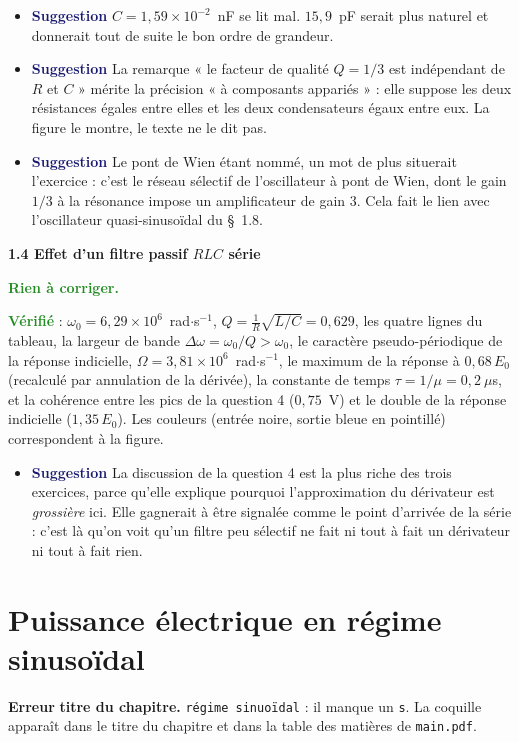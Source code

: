 \documentclass[a4paper,11pt]{article}
\newcommand{\exo}[1]{\vspace{0.7\baselineskip}\noindent\textbf{\large #1}\par\nopagebreak\vspace{0.2\baselineskip}}
\newcommand{\erreur}{\textcolor{BrickRed}{\textbf{Erreur}}}
\newcommand{\suggestion}{\textcolor{MidnightBlue}{\textbf{Suggestion}}}
\newcommand{\verifie}{\textcolor{ForestGreen}{\textbf{Vérifié}}}
\newcommand{\rien}{\textcolor{ForestGreen}{\textbf{Rien à corriger.}}}
\begin{document}
\begin{itemize}
	\item \suggestion{} $C=1{,}59\times10^{-2}$~nF se lit mal. $15{,}9$~pF serait plus naturel et
	donnerait tout de suite le bon ordre de grandeur.
	\item \suggestion{} La remarque « le facteur de qualité $Q=1/3$ est indépendant de $R$ et $C$ »
	mérite la précision « à composants appariés » : elle suppose les deux résistances égales entre
	elles et les deux condensateurs égaux entre eux. La figure le montre, le texte ne le dit pas.
	\item \suggestion{} Le pont de Wien étant nommé, un mot de plus situerait l'exercice : c'est le
	réseau sélectif de l'oscillateur à pont de Wien, dont le gain $1/3$ à la résonance impose un
	amplificateur de gain $3$. Cela fait le lien avec l'oscillateur quasi-sinusoïdal du \S~1.8.
\end{itemize}

\exo{1.4 Effet d'un filtre passif $RLC$ série}

\rien{}

\verifie{} : $\omega_0=6{,}29\times10^{6}$~rad$\cdot$s$^{-1}$, $Q=\frac{1}{R}\sqrt{L/C}=0{,}629$, les
quatre lignes du tableau, la largeur de bande $\Delta\omega=\omega_0/Q>\omega_0$, le caractère
pseudo-périodique de la réponse indicielle, $\Omega=3{,}81\times10^{6}$~rad$\cdot$s$^{-1}$, le
maximum de la réponse à $0{,}68\,E_0$ (recalculé par annulation de la dérivée), la constante de temps
$\tau=1/\mu=0{,}2~\mu$s, et la cohérence entre les pics de la question 4 ($0{,}75$~V) et le double de
la réponse indicielle ($1{,}35\,E_0$). Les couleurs (entrée noire, sortie bleue en pointillé)
correspondent à la figure.

\begin{itemize}
	\item \suggestion{} La discussion de la question 4 est la plus riche des trois exercices, parce
	qu'elle explique pourquoi l'approximation du dérivateur est \textit{grossière} ici. Elle gagnerait
	à être signalée comme le point d'arrivée de la série : c'est là qu'on voit qu'un filtre peu
	sélectif ne fait ni tout à fait un dérivateur ni tout à fait rien.
\end{itemize}

\section{Puissance électrique en régime sinusoïdal}

\erreur{} \textbf{titre du chapitre.} \texttt{régime sinuo\"idal} : il manque un \texttt{s}.
La coquille apparaît dans le titre du chapitre et dans la table des matières de \texttt{main.pdf}.
\end{document}
